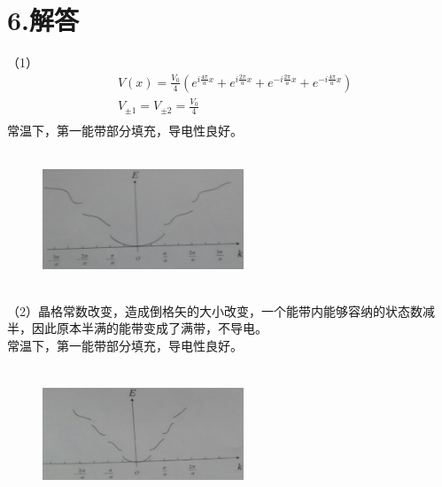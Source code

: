 \documentclass[UTF8]{ctexart}
\begin{document}
\section*{\bfseries 6.解答}
（1）
\begin{equation*}
    \begin{aligned}
        & V(x)=\frac{V_0}{4}(e^{i\frac{4\pi}{a}x}+e^{i\frac{2\pi}{a}x}+e^{-i\frac{2\pi}{a}x}
        +e^{-i\frac{4\pi}{a}x})\\
        & V_{\pm1}=V_{\pm2}=\frac{V_0}{4}\\
    \end{aligned}
\end{equation*}
常温下，第一能带部分填充，导电性良好。\\
\begin{figure}[H]
    \centering
    \includegraphics[width=6cm,height=4cm]{6_1.png}
\end{figure}
（2）晶格常数改变，造成倒格矢的大小改变，一个能带内能够容纳的状态数减半，因此原本半满的能带变成了满带，不导电。\\
常温下，第一能带部分填充，导电性良好。\\
\begin{figure}[H]
    \centering
    \includegraphics[width=6cm,height=4cm]{6_2.png}
\end{figure}
\end{document}
